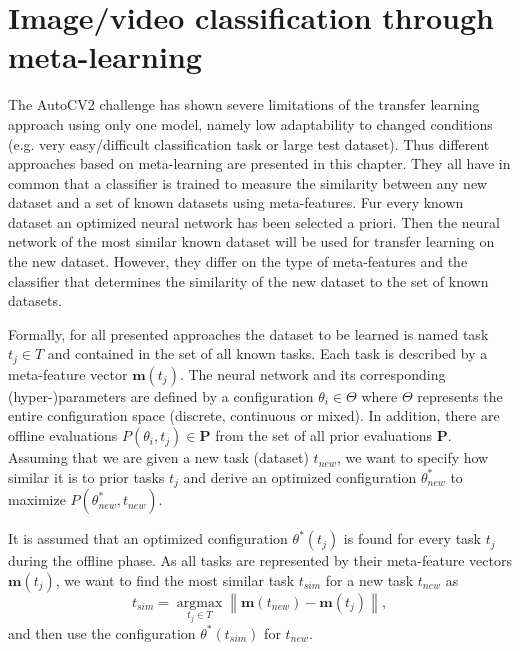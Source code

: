 \documentclass{article}
\begin{document}
\section{Image/video classification through meta-learning}
\label{sec:ml}

The AutoCV2 challenge has shown severe limitations of the transfer learning approach using only one model, namely low adaptability to changed conditions (e.g. very easy/difficult classification task or large test dataset). Thus different approaches based on meta-learning are presented in this chapter. They all have in common that a classifier is trained to measure the similarity between any new dataset and a set of known datasets using meta-features. Fur every known dataset an optimized neural network has been selected a priori. Then the neural network of the most similar known dataset will be used for transfer learning on the new dataset. However, they differ on the type of meta-features and the classifier that determines the similarity of the new dataset to the set of known datasets. 

Formally, for all presented approaches the dataset to be learned is named task $t_j \in T$ and contained in the set of all known tasks. Each task is described by a meta-feature vector $\mathbf{m}(t_j)$. The neural network and its corresponding (hyper-)parameters are defined by a configuration $\theta_i \in \Theta$ where $\Theta$ represents the entire configuration space (discrete, continuous or mixed). In addition, there are offline evaluations $P(\theta_i, t_j) \in \mathbf{P}$ from the set of all prior evaluations $\mathbf{P}$. Assuming that we are given a new task (dataset) $t_{new}$, we want to specify how similar it is to prior tasks $t_j$ and derive an optimized configuration $\theta^*_{new}$ to maximize $P(\theta^*_{new}, t_{new})$.

It is assumed that an optimized configuration $\theta^*(t_j)$ is found for every task $t_j$ during the offline phase. As all tasks are represented by their meta-feature vectors $\mathbf{m}(t_j)$, we want to find the most similar task $t_{sim}$ for a new task $t_{new}$ as 
%
\begin{equation}
t_{sim} = \underset{t_j \in T}{\operatorname{argmax}}  \left\|\mathbf{m}(t_{new}) - \mathbf{m}(t_j)\right\|, 
\label{eq:tsim}
\end{equation}
%
and then use the configuration $\theta^*(t_{sim})$ for $t_{new}$. 
\end{document}

